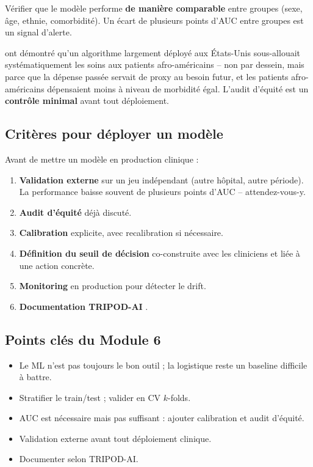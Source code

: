 \documentclass[11pt,a4paper]{article}
\begin{document}
V\'erifier que le mod\`ele performe \textbf{de mani\`ere comparable}
entre groupes (sexe, \^age, ethnie, comorbidit\'e). Un \'ecart de
plusieurs points d'AUC entre groupes est un signal d'alerte.

\citet{obermeyer2019dissecting} ont d\'emontr\'e qu'un algorithme
largement d\'eploy\'e aux \'Etats-Unis sous-allouait syst\'ematiquement
les soins aux patients afro-am\'ericains -- non par dessein, mais parce
que la d\'epense pass\'ee servait de proxy au besoin futur, et les
patients afro-am\'ericains d\'epensaient moins \`a niveau de morbidit\'e
\'egal. L'audit d'\'equit\'e est un \textbf{contr\^ole minimal} avant tout
d\'eploiement.

\subsection{Crit\`eres pour d\'eployer un mod\`ele}

Avant de mettre un mod\`ele en production clinique :

\begin{enumerate}
  \item \textbf{Validation externe} sur un jeu ind\'ependant (autre
        h\^opital, autre p\'eriode). La performance baisse souvent de
        plusieurs points d'AUC -- attendez-vous-y.
  \item \textbf{Audit d'\'equit\'e} d\'ej\`a discut\'e.
  \item \textbf{Calibration} explicite, avec recalibration si
        n\'ecessaire.
  \item \textbf{D\'efinition du seuil de d\'ecision} co-construite avec
        les cliniciens et li\'ee \`a une action concr\`ete.
  \item \textbf{Monitoring} en production pour d\'etecter le drift.
  \item \textbf{Documentation TRIPOD-AI} \citep{collins2024tripodai}.
\end{enumerate}

\subsection{Points cl\'es du Module 6}

\begin{itemize}
  \item Le ML n'est pas toujours le bon outil ; la logistique reste un
        baseline difficile \`a battre.
  \item Stratifier le train/test ; valider en CV $k$-folds.
  \item AUC est n\'ecessaire mais pas suffisant : ajouter calibration
        et audit d'\'equit\'e.
  \item Validation externe avant tout d\'eploiement clinique.
  \item Documenter selon TRIPOD-AI.
\end{itemize}
\end{document}
